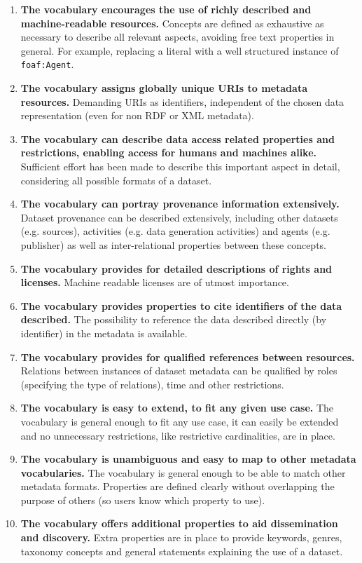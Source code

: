 \documentclass[a4paper,english,twoside,BCOR1.5cm,headsepline,DIV12,appendixprefix,final,12pt]{scrbook}
\newcommand{\prop}[1]{{{\texttt{#1}}}}
\begin{document}
\begin{enumerate}[A]
\item \textbf{The vocabulary encourages the use of richly described and machine-readable resources.} 
Concepts are defined as exhaustive as necessary to describe all relevant aspects, avoiding free text properties in general. For example, replacing a literal with a well structured instance of \prop{foaf:Agent}. 
\item \textbf{The vocabulary assigns globally unique URIs to metadata resources.} Demanding URIs as identifiers, independent of the chosen data representation (even for non RDF or XML metadata).
\item \textbf{The vocabulary can describe data access related properties and restrictions, enabling access for humans and machines alike.} Sufficient effort has been made to describe this important aspect in detail, considering all possible formats of a dataset.
\item \textbf{The vocabulary can portray provenance information extensively.} Dataset provenance can be described extensively, including other datasets (e.g. sources), activities (e.g. data generation activities) and agents (e.g. publisher) as well as inter-relational properties between these concepts.
\item \textbf{The vocabulary provides for detailed descriptions of rights and licenses.} Machine readable licenses are of utmost importance.
\item \textbf{The vocabulary provides properties to cite identifiers of the data described.} The possibility to reference the data described directly (by identifier) in the metadata is available.
\item \textbf{The vocabulary provides for qualified references between resources.} Relations between instances of dataset metadata can be qualified by roles (specifying the type of relations), time and other restrictions.
\item \textbf{The vocabulary is easy to extend, to fit any given use case.} The vocabulary is general enough to fit any use case, it can easily be extended and no unnecessary restrictions, like restrictive cardinalities, are in place.
\item \textbf{The vocabulary is unambiguous and easy to map to other metadata vocabularies.} The vocabulary is general enough to be able to match other metadata formats. Properties are defined clearly without overlapping the purpose of others (so users know which property to use).
\item \textbf{The vocabulary offers additional properties to aid dissemination and discovery.} Extra properties are in place to provide keywords, genres, taxonomy concepts and general statements explaining the use of a dataset.
\end{enumerate}
\end{document}
